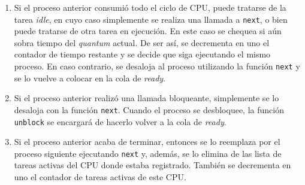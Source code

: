 \begin{enumerate}
    \item Si el proceso anterior consumió todo el ciclo de CPU, puede tratarse
    de la tarea \emph{idle}, en cuyo caso simplemente se realiza una llamada a
    \texttt{next}, o bien puede tratarse de otra tarea en ejecución. En este
    caso se chequea si aún sobra tiempo del \emph{quantum} actual. De ser así,
    se decrementa en uno el contador de tiempo restante y se decide que siga
    ejecutando el mismo proceso. En caso contrario, se desaloja al proceso
    utilizando la función \texttt{next} y se lo vuelve a colocar en la cola de
    \emph{ready}.
    \item Si el proceso anterior realizó una llamada bloqueante, simplemente se
    lo desaloja con la función \texttt{next}. Cuando el proceso se desbloquee,
    la función \texttt{unblock} se encargará de hacerlo volver a la cola de
    \emph{ready}.
    \item Si el proceso anterior acaba de terminar, entonces se lo reemplaza por
    el proceso siguiente ejecutando \texttt{next} y, además, se lo elimina de
    las lista de tareas activas del CPU donde estaba registrado. También se
    decrementa en uno el contador de tareas activas de este CPU.
\end{enumerate}
